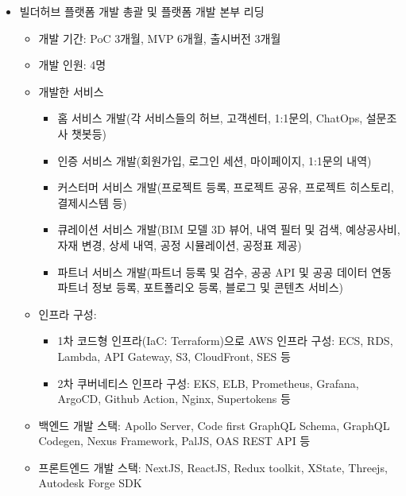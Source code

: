 \documentclass[10pt,a4paper,ragged2e]{altacv}
\begin{document}
\begin{fullwidth}

	\begin{itemize}
		\item 빌더허브 플랫폼 개발 총괄 및 플랫폼 개발 본부 리딩
		      \begin{itemize}[label=$\star$]
            \item 개발 기간: PoC 3개월, MVP 6개월, 출시버전 3개월
            \item 개발 인원: 4명
			      \item 개발한 서비스
			            \begin{itemize}
				            \item 홈 서비스 개발(각 서비스들의 허브, 고객센터, 1:1문의, ChatOps, 설문조사 챗봇등)
				            \item 인증 서비스 개발(회원가입, 로그인 세션, 마이페이지, 1:1문의 내역)
				            \item 커스터머 서비스 개발(프로젝트 등록, 프로젝트 공유, 프로젝트 히스토리, 결제시스템 등)
				            \item 큐레이션 서비스 개발(BIM 모델 3D 뷰어, 내역 필터 및 검색, 예상공사비, 자재 변경, 상세 내역, 공정 시뮬레이션, 공정표 제공)
				            \item 파트너 서비스 개발(파트너 등록 및 검수, 공공 API 및 공공 데이터 연동 파트너 정보 등록, 포트폴리오 등록, 블로그 및 콘텐츠 서비스)
			            \end{itemize}
			      \item 인프라 구성:
			            \begin{itemize}
				            \item 1차 코드형 인프라(IaC: Terraform)으로 AWS 인프라 구성: ECS, RDS, Lambda, API Gateway, S3, CloudFront, SES 등
				            \item 2차 쿠버네티스 인프라 구성: EKS, ELB, Prometheus, Grafana, ArgoCD, Github Action, Nginx, Supertokens 등
			            \end{itemize}
			      \item 백엔드 개발 스택: Apollo Server, Code first GraphQL Schema, GraphQL Codegen, Nexus Framework, PalJS, OAS REST API 등
			      \item 프론트엔드 개발 스택: NextJS, ReactJS, Redux toolkit, XState, Threejs, Autodesk Forge SDK
		      \end{itemize}

\end{itemize}
\end{fullwidth}
\end{document}
